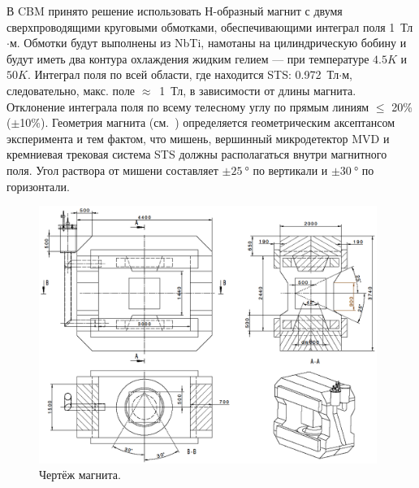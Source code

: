 В CBM принято решение использовать Н-образный магнит с двумя сверхпроводящими круговыми обмотками, обеспечивающими интеграл поля 1~Тл$\cdot$м. Обмотки будут выполнены из NbTi, намотаны на цилиндрическую бобину и будут иметь два контура охлаждения жидким гелием --- при температуре $4.5K$ и $50K$.
Интеграл поля по всей области, где находится STS: 0.972~Тл$\cdot$м, следовательно, макс. поле $\approx$~1~Тл, в зависимости от длины магнита. Отклонение интеграла поля по всему телесному углу по прямым линиям $\leq$ 20\% ($\pm$10\%).
Геометрия магнита (см.~) определяется геометрическим аксептансом эксперимента и тем фактом, что мишень, вершинный микродетектор MVD и кремниевая трековая система STS должны располагаться внутри магнитного поля.
Угол раствора от мишени составляет $\pm \SI{25}{\degree}$ по вертикали и $\pm \SI{30}{\degree}$ по горизонтали.



\begin{figure}[H]
\includegraphics[width=0.98\textwidth]{pictures/Magnet_drawing.png}
\caption{Чертёж магнита.} %
\label{fig:MagnetDrawing}
\end{figure}

